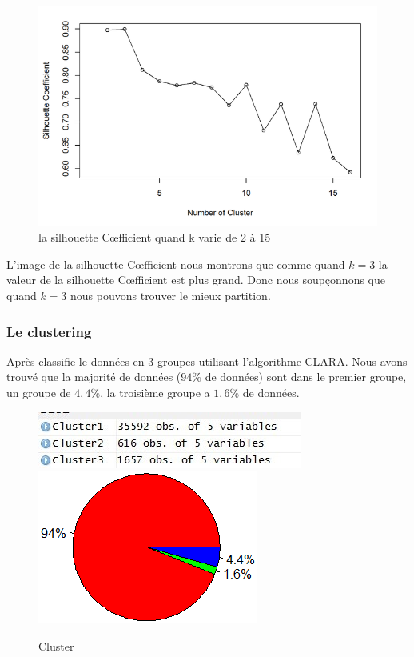 \begin{figure}[H]
\centering
\includegraphics[width=0.9\linewidth]{images/sc}
\caption{la silhouette C\oe fficient quand k varie de 2 à 15}
\label{fig:sc}
\end{figure}

L'image de la silhouette C\oe fficient nous montrons que comme quand $k=3$ la valeur de la silhouette C\oe fficient est plus grand. Donc nous soupçonnons que quand $k=3$ nous pouvons trouver le mieux partition.

\subsubsection{Le clustering}
Après classifie le données en 3 groupes utilisant l'algorithme CLARA. Nous avons trouvé que la majorité de données ($94 \%$ de données) sont dans le premier groupe, un groupe de $4,4 \%$, la troisième groupe a $1,6 \%$ de données.  

 \begin{figure}[H]
 	\flushleft
 	 \includegraphics[width=0.45\linewidth]{images/3cluster}
 	 \label{fig:3cluster}
 	\hspace{1in}	 
 	\includegraphics[width=0.325\linewidth]{images/piechart}
 	\label{fig:piechart}
 	\caption{Cluster} 
 \end{figure}

